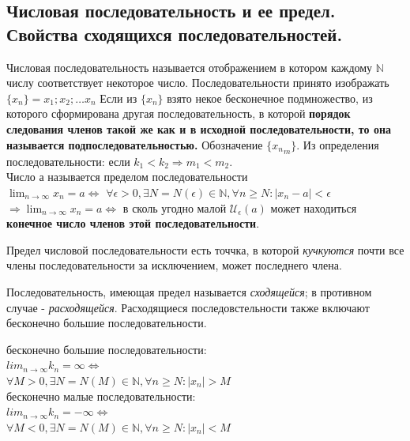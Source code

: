 \documentclass[oneside]{book}
\begin{document}
\begin{enumerate}
\chapter[Последовательности]{Числовая последовательность и ее предел. Свойства сходящихся последовательностей.}
Числовая последовательность называется отображением в котором каждому $\mathbb{N}$ числу соответствует
некоторое число. Последовательности принято изображать $\{x_n\} = x_1; x_2; \dots x_n$
Если из $\{x_n\}$ взято некое бесконечное подмножество, из которого сформирована другая последовательность,
в которой \textbf{порядок следования членов такой же как и в исходной последовательности, то она
	называется подпоследовательностью.} Обозначение $\{{x_n}_m\}$.
Из определения последовательности: если $k_1 < k_2 \Rightarrow m_1 < m_2$.\\
Число а называется пределом последовательности \\ $\lim_{n \rightarrow \infty}{x_n = a} \Leftrightarrow$
$\forall\epsilon>0,  \exists N=N(\epsilon) \in \mathbb{N}, \forall n \geq N: |x_n - a| < \epsilon$
$\Rightarrow \lim_{n \rightarrow \infty}{x_n = a} \Leftrightarrow$ в сколь угодно малой $\mathcal{U}_\epsilon(a)$
может находиться \textbf{конечное число членов этой последовательности}.

Предел числовой последовательности есть точчка, в которой \textit{кучкуются} почти все члены последовательности
за исключением, может последнего члена.

Последовательность, имеющая предел называется \textit{сходящейся}; в противном случае - \textit{расходящейся}.
Расходящиеся последовстельности также включают бесконечно большие последовательности.
\begin{center}
	бесконечно большие последовательности:\\
	$lim_{n \rightarrow \infty}{k_n} = \infty \Leftrightarrow$ \\
	$\forall M > 0, \exists N=N(M) \in \mathbb{N}, \forall n \geq N: |x_n| > M$ \\
	бесконечно малые последовательности:\\
	$lim_{n \rightarrow \infty}{k_n} = -\infty \Leftrightarrow$\\
	$\forall M < 0, \exists N=N(M) \in \mathbb{N}, \forall n \geq N: |x_n| < M$ \\
\end{center}


\end{enumerate}
\end{document}
